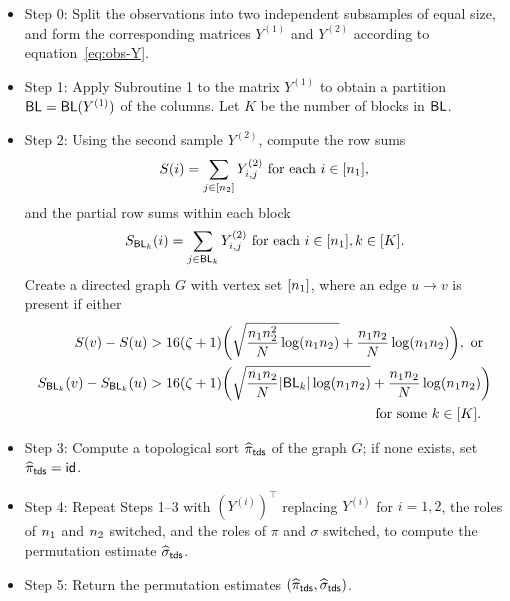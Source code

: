 \documentclass[final,12pt]{colt2018} %
\begin{document}
\begin{itemize}
\item Step 0: Split the observations into two independent subsamples
  of equal size, and form the corresponding matrices $Y^{(1)}$ and
  $Y^{(2)}$ according to equation~\eqref{eq:obs-Y}.

\item Step 1: Apply Subroutine 1 to the matrix $Y^{(1)}$ to obtain a
  partition $\mathsf{BL} = \mathsf{BL}(Y^{(1)})$ of the columns. Let $K$ be the number
  of blocks in $\mathsf{BL}$.

\item Step 2: Using the second sample $Y^{(2)}$, compute the row sums
\begin{align*}
S(i) = \sum_{j \in [n_2]} Y^{(2)}_{i,j} \text{ for each }i \in
[n_1],
\end{align*} 
and the partial row sums within each block 
\begin{align*}
S_{\mathsf{BL}_k}(i) = \sum_{j \in \mathsf{BL}_k} Y^{(2)}_{i,j} \text{ for each }i \in
[n_1], k \in [K].
\end{align*}
Create a directed graph $G$ with vertex set $[n_1]$, where an edge
$u \to v$ is present if either
\begin{subequations}
\begin{align}
S(v) - S(u) & > 16 (\zeta + 1) \bigg( \sqrt{\frac{n_1
    n_2^2}{N} \log(n_1 n_2) } + \frac{n_1 n_2}{N}
\log(n_1 n_2) \bigg), \text{ or} \label{eq:full-sum}
\\ S_{\mathsf{BL}_k}(v) - S_{\mathsf{BL}_k}(u) & > 16 (\zeta + 1) \bigg(
\sqrt{\frac{n_1 n_2}{N} |\mathsf{BL}_k| \log(n_1 n_2) } +
\frac{n_1 n_2}{N} \log(n_1 n_2) \bigg) \notag \\
& \qquad \qquad \qquad \qquad \qquad \qquad \qquad \qquad \text{ for some
} k \in [K]. \label{eq:block-sum}
\end{align}
\end{subequations}

\item Step 3: Compute a topological sort $\widehat{\pi}_{\sf tds}$ of the graph $G$;
  if none exists, set $\widehat{\pi}_{\sf tds} = \mathsf{id}$.

\item Step 4: Repeat Steps 1--3 with $(Y^{(i)})^\top$ replacing
  $Y^{(i)}$ for $i=1,2$, the roles of $n_1$ and $n_2$
  switched, and the roles of $\pi$ and $\sigma$ switched, to compute
  the permutation estimate $\widehat{\sigma}_{\sf tds}$.

\item Step 5: Return the permutation estimates $(\widehat{\pi}_{\sf tds},
  \widehat{\sigma}_{\sf tds})$.
\end{itemize}
\end{document}
